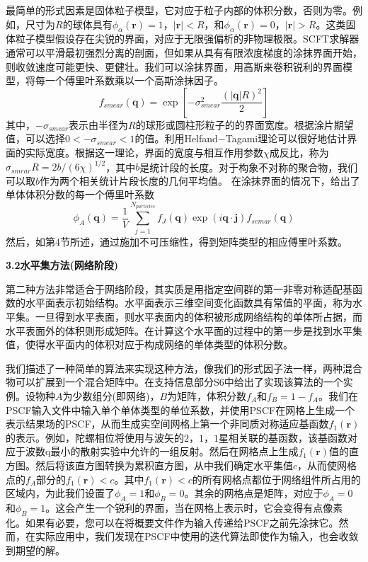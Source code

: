 \documentclass[12pt，a4paper]{article}
\numberwithin{equation}{section}
\begin{document}
最简单的形式因素是固体粒子模型，它对应于粒子内部的体积分数，否则为零。例如，尺寸为$R$的球体具有$\phi _{\alpha}(\mathbf{r})=1，|\mathbf{r}|<R$，和$\phi _{\alpha}(\mathbf{r})=0，|\mathbf{r}|>R$。这类固体粒子模型假设存在尖锐的界面，对应于无限强偏析的非物理极限。SCFT求解器通常可以平滑最初强烈分离的剖面，但如果从具有有限浓度梯度的涂抹界面开始，则收敛速度可能更快、更健壮。我们可以涂抹界面，用高斯来卷积锐利的界面模型，将每一个傅里叶系数乘以一个高斯涂抹因子。
\begin{equation}\label{14}
f_{smear}(\mathbf{q})=\exp \left[ -\sigma _{smear}^2 \frac{(|\mathbf{q}|R)^2}{2} \right]
\end{equation}
其中，$-\sigma _{smear}$表示由半径为$R$的球形或圆柱形粒子的的界面宽度。根据涂片期望值，可以选择$0<-\sigma _{smear}<1$的值。利用Helfand−Tagami理论可以很好地估计界面的实际宽度。根据这一理论，界面的宽度与相互作用参数$\chi$成反比，称为$\sigma _{smear} R=2b/(6 \chi)^{1/2}$，其中$b$是统计段的长度。对于构象不对称的聚合物，我们可以取$b$作为两个相关统计片段长度的几何平均值。
在涂抹界面的情况下，给出了单体体积分数的每一个傅里叶系数
\begin{equation}\label{15}
\phi _A(\mathbf{q})=\frac{1}{V}\sum _{j=1}^{N_{particles}} f_J(\mathbf{q})\exp (i \mathbf{q \cdot \mathbf{j}}) f_{semar}(\mathbf{q})
\end{equation}
然后，如第4节所述，通过施加不可压缩性，得到矩阵类型的相应傅里叶系数。

\textbf{3.2水平集方法(网络阶段)}

第二种方法非常适合于网络阶段，其实质是用指定空间群的第一非零对称适配基函数的水平面表示初始结构。水平面表示三维空间变化函数具有常值的平面，称为水平集。一旦得到水平表面，则水平表面内的体积被形成网络结构的单体所占据，而水平表面外的体积则形成矩阵。在计算这个水平面的过程中的第一步是找到水平集值，使得水平面内的体积对应于构成网络的单体类型的体积分数。

我们描述了一种简单的算法来实现这种方法，像我们的形式因子法一样，两种混合物可以扩展到一个混合矩阵中。在支持信息部分S6中给出了实现该算法的一个实例。设物种$A$为少数组分(即网络)，$B$为矩阵，体积分数$f_A$和$f_B=1−f_A$。我们在PSCF输入文件中输入单个单体类型的单位系数，并使用PSCF在网格上生成一个表示结果场的PSCF，从而生成实空间网格上第一个非同质对称适应基函数$f_1(\mathbf{r})$的表示。例如，陀螺相位将使用与波矢的${2，1，1}$星相关联的基函数，该基函数对应于波数q最小的散射实验中允许的一组反射。然后在网格点上生成$f_1(\mathbf{r})$值的直方图。然后将该直方图转换为累积直方图，从中我们确定水平集值$c$，从而使网格点的$f_A$部分的$f_1(\mathbf{r})<c$。其中$f_1(\mathbf{r})<c$的所有网格点都位于网络组件所占用的区域内，为此我们设置了$\phi _A=1$和$\phi _B=0$。其余的网格点是矩阵，对应于$\phi _A=0$和$\phi _B=1$。这会产生一个锐利的界面，当在网格上表示时，它会变得有点像素化。如果有必要，您可以在将概要文件作为输入传递给PSCF之前先涂抹它。然而，在实际应用中，我们发现在PSCF中使用的迭代算法即使作为输入，也会收敛到期望的解。
\end{document}
